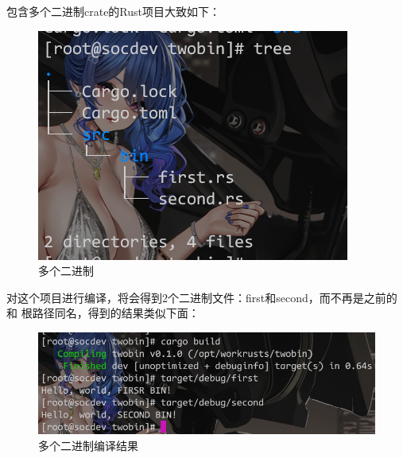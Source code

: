 包含多个二进制crate的Rust项目大致如下：
\begin{figure}[H]
  \centering
  \includegraphics[width=\linewidth]{rust_more_bin.png}
  \caption{多个二进制}
  \label{fig:rust_more_bin}
\end{figure}
对这个项目进行编译，将会得到2个二进制文件：first和second，而不再是之前的和
根路径同名，得到的结果类似下面：
\begin{figure}[H]
  \centering
  \includegraphics[width=\linewidth]{rust_more_bin_res.png}
  \caption{多个二进制编译结果}
  \label{fig:rust_more_bin_res}
\end{figure}

